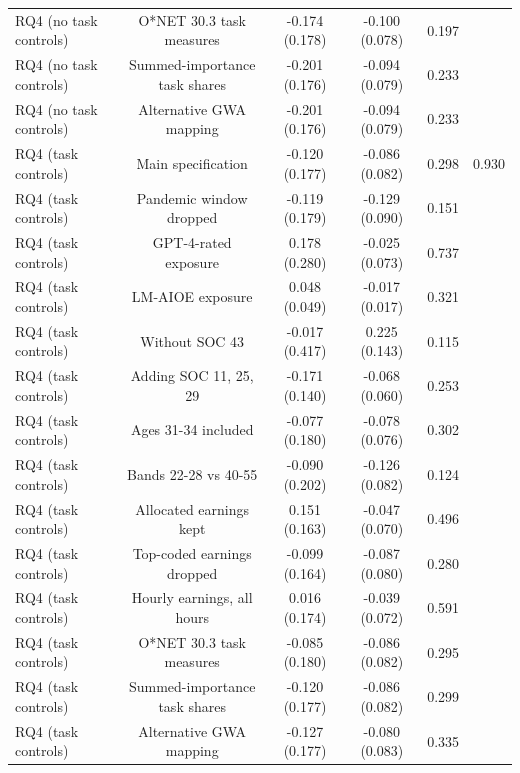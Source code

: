 \begin{table}[htbp]
\begin{tabular}{lccccc}
RQ4 (no task controls) & O*NET 30.3 task measures & -0.174 (0.178) & -0.100 (0.078) & 0.197 &  \\
RQ4 (no task controls) & Summed-importance task shares & -0.201 (0.176) & -0.094 (0.079) & 0.233 &  \\
RQ4 (no task controls) & Alternative GWA mapping & -0.201 (0.176) & -0.094 (0.079) & 0.233 &  \\
RQ4 (task controls) & Main specification & -0.120 (0.177) & -0.086 (0.082) & 0.298 & 0.930 \\
RQ4 (task controls) & Pandemic window dropped & -0.119 (0.179) & -0.129 (0.090) & 0.151 &  \\
RQ4 (task controls) & GPT-4-rated exposure & 0.178 (0.280) & -0.025 (0.073) & 0.737 &  \\
RQ4 (task controls) & LM-AIOE exposure & 0.048 (0.049) & -0.017 (0.017) & 0.321 &  \\
RQ4 (task controls) & Without SOC 43 & -0.017 (0.417) & 0.225 (0.143) & 0.115 &  \\
RQ4 (task controls) & Adding SOC 11, 25, 29 & -0.171 (0.140) & -0.068 (0.060) & 0.253 &  \\
RQ4 (task controls) & Ages 31-34 included & -0.077 (0.180) & -0.078 (0.076) & 0.302 &  \\
RQ4 (task controls) & Bands 22-28 vs 40-55 & -0.090 (0.202) & -0.126 (0.082) & 0.124 &  \\
RQ4 (task controls) & Allocated earnings kept & 0.151 (0.163) & -0.047 (0.070) & 0.496 &  \\
RQ4 (task controls) & Top-coded earnings dropped & -0.099 (0.164) & -0.087 (0.080) & 0.280 &  \\
RQ4 (task controls) & Hourly earnings, all hours & 0.016 (0.174) & -0.039 (0.072) & 0.591 &  \\
RQ4 (task controls) & O*NET 30.3 task measures & -0.085 (0.180) & -0.086 (0.082) & 0.295 &  \\
RQ4 (task controls) & Summed-importance task shares & -0.120 (0.177) & -0.086 (0.082) & 0.299 &  \\
RQ4 (task controls) & Alternative GWA mapping & -0.127 (0.177) & -0.080 (0.083) & 0.335 &  \\
\bottomrule
\end{tabular}
\par\vspace{2pt}{\footnotesize Post average = mean of the post-period coefficients (relative to the reference quarter 2022Q3 only). Post minus pre = mean post coefficient minus mean pre coefficient, which does not depend on the choice of reference quarter. Clustered standard errors in parentheses from the saved covariance matrices; p-values from the normal distribution. Holm p adjusts the four main-specification post-minus-pre contrasts for multiple testing. Model 2 has no pre-period coefficients. * p<0.10, ** p<0.05, *** p<0.01.}
\end{table}
